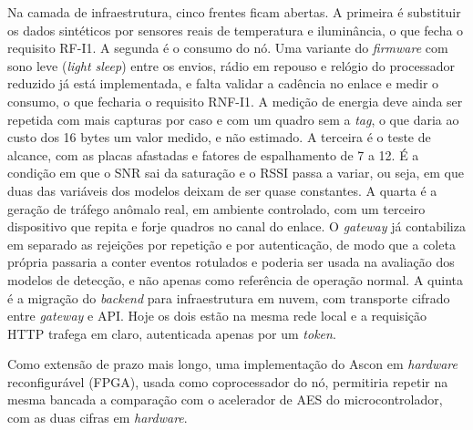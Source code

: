 Na camada de infraestrutura, cinco frentes ficam abertas. A primeira é substituir os dados sintéticos por sensores reais de temperatura e iluminância, o que fecha o requisito RF-I1. A segunda é o consumo do nó. Uma variante do \textit{firmware} com sono leve (\textit{light sleep}) entre os envios, rádio em repouso e relógio do processador reduzido já está implementada, e falta validar a cadência no enlace e medir o consumo, o que fecharia o requisito RNF-I1. A medição de energia deve ainda ser repetida com mais capturas por caso e com um quadro sem a \textit{tag}, o que daria ao custo dos 16 bytes um valor medido, e não estimado. A terceira é o teste de alcance, com as placas afastadas e fatores de espalhamento de 7 a 12. É a condição em que o SNR sai da saturação e o RSSI passa a variar, ou seja, em que duas das variáveis dos modelos deixam de ser quase constantes. A quarta é a geração de tráfego anômalo real, em ambiente controlado, com um terceiro dispositivo que repita e forje quadros no canal do enlace. O \textit{gateway} já contabiliza em separado as rejeições por repetição e por autenticação, de modo que a coleta própria passaria a conter eventos rotulados e poderia ser usada na avaliação dos modelos de detecção, e não apenas como referência de operação normal. A quinta é a migração do \textit{backend} para infraestrutura em nuvem, com transporte cifrado entre \textit{gateway} e API. Hoje os dois estão na mesma rede local e a requisição HTTP trafega em claro, autenticada apenas por um \textit{token}.

Como extensão de prazo mais longo, uma implementação do Ascon em \textit{hardware} reconfigurável (FPGA), usada como coprocessador do nó, permitiria repetir na mesma bancada a comparação com o acelerador de AES do microcontrolador, com as duas cifras em \textit{hardware}.
